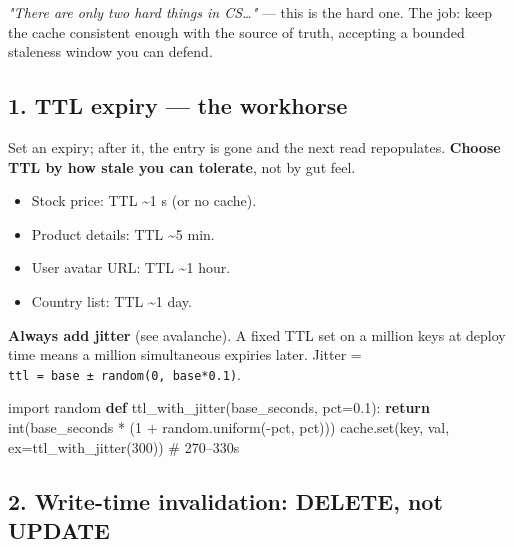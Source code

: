 \documentclass[11pt]{article}
\providecommand{\tightlist}{\setlength{\itemsep}{1pt}\setlength{\parskip}{0pt}}
\newenvironment{Shaded}{\begin{snugshade}}{\end{snugshade}}
\newcommand{\BuiltInTok}[1]{\textcolor[rgb]{0.50,0.55,0.55}{#1}}
\newcommand{\CommentTok}[1]{\textcolor[rgb]{0.48,0.49,0.49}{#1}}
\newcommand{\ControlFlowTok}[1]{\textcolor[rgb]{0.99,0.74,0.29}{\textbf{#1}}}
\newcommand{\DecValTok}[1]{\textcolor[rgb]{0.96,0.45,0.00}{#1}}
\newcommand{\FloatTok}[1]{\textcolor[rgb]{0.96,0.45,0.00}{#1}}
\newcommand{\ImportTok}[1]{\textcolor[rgb]{0.15,0.68,0.38}{#1}}
\newcommand{\KeywordTok}[1]{\textcolor[rgb]{0.81,0.81,0.76}{\textbf{#1}}}
\newcommand{\NormalTok}[1]{\textcolor[rgb]{0.81,0.81,0.76}{#1}}
\newcommand{\OperatorTok}[1]{\textcolor[rgb]{0.81,0.81,0.76}{#1}}
\begin{document}
\emph{"There are only two hard things in CS\ldots"} --- this is the hard one. The job: keep the cache consistent enough with the source of truth, accepting a bounded staleness window you can defend.

\subsection{1. TTL expiry --- the workhorse}\label{1-ttl-expiry--the-workhorse}

Set an expiry; after it, the entry is gone and the next read repopulates. \textbf{Choose TTL by how stale you can tolerate}, not by gut feel.

\begin{itemize}
\tightlist
\item
  Stock price: TTL \textasciitilde1 s (or no cache).
\item
  Product details: TTL \textasciitilde5 min.
\item
  User avatar URL: TTL \textasciitilde1 hour.
\item
  Country list: TTL \textasciitilde1 day.
\end{itemize}

\textbf{Always add jitter} (see avalanche). A fixed TTL set on a million keys at deploy time means a million simultaneous expiries later. Jitter = \texttt{ttl\ =\ base\ ±\ random(0,\ base*0.1)}.


\begin{Shaded}
\begin{Highlighting}[]
\ImportTok{import}\NormalTok{ random}
\KeywordTok{def}\NormalTok{ ttl\_with\_jitter(base\_seconds, pct}\OperatorTok{=}\FloatTok{0.1}\NormalTok{):}
    \ControlFlowTok{return} \BuiltInTok{int}\NormalTok{(base\_seconds }\OperatorTok{*}\NormalTok{ (}\DecValTok{1} \OperatorTok{+}\NormalTok{ random.uniform(}\OperatorTok{{-}}\NormalTok{pct, pct)))}
\NormalTok{cache.}\BuiltInTok{set}\NormalTok{(key, val, ex}\OperatorTok{=}\NormalTok{ttl\_with\_jitter(}\DecValTok{300}\NormalTok{))   }\CommentTok{\# 270–330s}
\end{Highlighting}
\end{Shaded}

\subsection{2. Write-time invalidation: DELETE, not UPDATE}\label{2-write-time-invalidation-delete-not-update}
\end{document}
